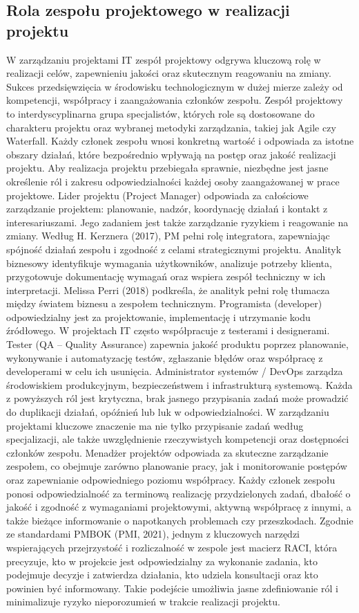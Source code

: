     \subsection{Rola zespołu projektowego w realizacji projektu}
    W zarządzaniu projektami IT zespół projektowy odgrywa kluczową rolę w realizacji celów, zapewnieniu jakości oraz skutecznym reagowaniu na zmiany. Sukces przedsięwzięcia w środowisku technologicznym w dużej mierze zależy od kompetencji, współpracy i zaangażowania członków zespołu. Zespół projektowy to interdyscyplinarna grupa specjalistów, których role są dostosowane do charakteru projektu oraz wybranej metodyki zarządzania, takiej jak Agile czy Waterfall. Każdy członek zespołu wnosi konkretną wartość i odpowiada za istotne obszary działań, które bezpośrednio wpływają na postęp oraz jakość realizacji projektu. Aby realizacja projektu przebiegała sprawnie, niezbędne jest jasne określenie ról i zakresu odpowiedzialności każdej osoby zaangażowanej w prace projektowe. Lider projektu (Project Manager) odpowiada za całościowe zarządzanie projektem: planowanie, nadzór, koordynację działań i kontakt z interesariuszami. Jego zadaniem jest także zarządzanie ryzykiem i reagowanie na zmiany. Według H. Kerznera (2017), PM pełni rolę integratora, zapewniając spójność działań zespołu i zgodność z celami strategicznymi projektu. Analityk biznesowy identyfikuje wymagania użytkowników, analizuje potrzeby klienta, przygotowuje dokumentację wymagań oraz wspiera zespół techniczny w ich interpretacji. Melissa Perri (2018) podkreśla, że analityk pełni rolę tłumacza między światem biznesu a zespołem technicznym. Programista (developer) odpowiedzialny jest za projektowanie, implementację i utrzymanie kodu źródłowego. W projektach IT często współpracuje z testerami i designerami. Tester (QA – Quality Assurance) zapewnia jakość produktu poprzez planowanie, wykonywanie i automatyzację testów, zgłaszanie błędów oraz współpracę z developerami w celu ich usunięcia. Administrator systemów / DevOps zarządza środowiskiem produkcyjnym, bezpieczeństwem i infrastrukturą systemową. Każda z powyższych ról jest krytyczna, brak jasnego przypisania zadań może prowadzić do duplikacji działań, opóźnień lub luk w odpowiedzialności. 
W zarządzaniu projektami kluczowe znaczenie ma nie tylko przypisanie zadań według specjalizacji, ale także uwzględnienie rzeczywistych kompetencji oraz dostępności członków zespołu. Menadżer projektów odpowiada za skuteczne zarządzanie zespołem, co obejmuje zarówno planowanie pracy, jak i monitorowanie postępów oraz zapewnianie odpowiedniego poziomu współpracy. Każdy członek zespołu ponosi odpowiedzialność za terminową realizację przydzielonych zadań, dbałość o jakość i zgodność z wymaganiami projektowymi, aktywną współpracę z innymi, a także bieżące informowanie o napotkanych problemach czy przeszkodach. Zgodnie ze standardami PMBOK (PMI, 2021), jednym z kluczowych narzędzi wspierających przejrzystość i rozliczalność w zespole jest macierz RACI, która precyzuje, kto w projekcie jest odpowiedzialny za wykonanie zadania, kto podejmuje decyzje i zatwierdza działania, kto udziela konsultacji oraz kto powinien być informowany. Takie podejście umożliwia jasne zdefiniowanie ról i minimalizuje ryzyko nieporozumień w trakcie realizacji projektu.
